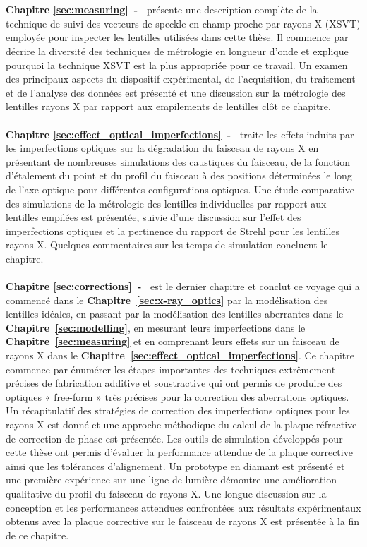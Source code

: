 \\
\\
\textbf{Chapitre \ref{sec:measuring}~-~} présente une description complète de la technique de suivi des vecteurs de speckle en champ proche par rayons X (XSVT) employée pour inspecter les lentilles utilisées dans cette thèse. Il commence par décrire la diversité des techniques de métrologie en longueur d’onde et explique pourquoi la technique XSVT est la plus appropriée pour ce travail. Un examen des principaux aspects du dispositif expérimental, de l’acquisition, du traitement et de l’analyse des données est présenté et une discussion sur la métrologie des lentilles rayons X par rapport aux empilements de lentilles clôt ce chapitre.
\\
\\
\textbf{Chapitre \ref{sec:effect_optical_imperfections}~-~} traite les effets induits par les imperfections optiques sur la dégradation du faisceau de rayons X en présentant de nombreuses simulations des caustiques du faisceau, de la fonction d’étalement du point et du profil du faisceau à des positions déterminées le long de l’axe optique pour différentes configurations optiques. Une étude comparative des simulations de la métrologie des lentilles individuelles par rapport aux lentilles empilées est présentée, suivie d’une discussion sur l’effet des imperfections optiques et la pertinence du rapport de Strehl pour les lentilles rayons X. Quelques commentaires sur les temps de simulation concluent le chapitre.
\\
\\
\textbf{Chapitre \ref{sec:corrections}~-~} est le dernier chapitre et conclut ce voyage qui a commencé dans le \textbf{Chapitre~\ref{sec:x-ray_optics}} par la modélisation des lentilles idéales, en passant par la modélisation des lentilles aberrantes dans le \textbf{Chapitre~\ref{sec:modelling}}, en mesurant leurs imperfections dans le \textbf{Chapitre~\ref{sec:measuring}} et en comprenant leurs effets sur un faisceau de rayons X dans le \textbf{Chapitre~\ref{sec:effect_optical_imperfections}}. Ce chapitre commence par énumérer les étapes importantes des techniques extrêmement précises de fabrication additive et soustractive qui ont permis de produire des optiques « free-form » très précises pour la correction des aberrations optiques. Un récapitulatif des stratégies de correction des imperfections optiques pour les rayons X est donné et une approche méthodique du calcul de la plaque réfractive de correction de phase est présentée. Les outils de simulation développés pour cette thèse ont permis d’évaluer la performance attendue de la plaque corrective ainsi que les tolérances d’alignement.  Un prototype en diamant est présenté et une première expérience sur une ligne de lumière démontre une amélioration qualitative du profil du faisceau de rayons X. Une longue discussion sur la conception et les performances attendues confrontées aux résultats expérimentaux obtenus avec la plaque corrective sur le faisceau de rayons X est présentée à la fin de ce chapitre.
